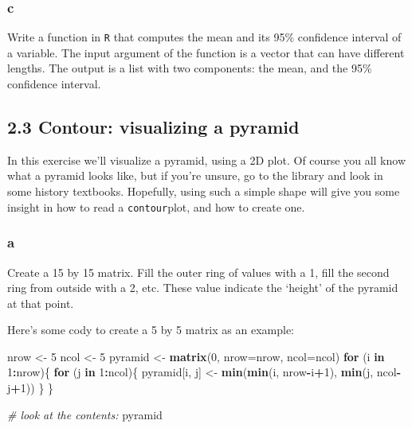 \documentclass[]{article}
\newenvironment{Shaded}{\begin{snugshade}}{\end{snugshade}}
\newcommand{\CommentTok}[1]{\textcolor[rgb]{0.56,0.35,0.01}{\textit{#1}}}
\newcommand{\ControlFlowTok}[1]{\textcolor[rgb]{0.13,0.29,0.53}{\textbf{#1}}}
\newcommand{\DataTypeTok}[1]{\textcolor[rgb]{0.13,0.29,0.53}{#1}}
\newcommand{\DecValTok}[1]{\textcolor[rgb]{0.00,0.00,0.81}{#1}}
\newcommand{\KeywordTok}[1]{\textcolor[rgb]{0.13,0.29,0.53}{\textbf{#1}}}
\newcommand{\NormalTok}[1]{#1}
\newcommand{\OperatorTok}[1]{\textcolor[rgb]{0.81,0.36,0.00}{\textbf{#1}}}
\newcommand{\StringTok}[1]{\textcolor[rgb]{0.31,0.60,0.02}{#1}}
\begin{document}
\hypertarget{c-7}{%
\subsubsection{c}\label{c-7}}

Write a function in \texttt{R} that computes the mean and its 95\(\%\)
confidence interval of a variable. The input argument of the function is
a vector that can have different lengths. The output is a list with two
components: the mean, and the 95\(\%\) confidence interval.

\hypertarget{contour-visualizing-a-pyramid}{%
\subsection{2.3 Contour: visualizing a
pyramid}\label{contour-visualizing-a-pyramid}}

In this exercise we'll visualize a pyramid, using a 2D plot. Of course
you all know what a pyramid looks like, but if you're unsure, go to the
library and look in some history textbooks. Hopefully, using such a
simple shape will give you some insight in how to read a
\texttt{contour}plot, and how to create one.

\hypertarget{a-7}{%
\subsubsection{a}\label{a-7}}

Create a 15 by 15 matrix. Fill the outer ring of values with a 1, fill
the second ring from outside with a 2, etc. These value indicate the
`height' of the pyramid at that point.

Here's some cody to create a 5 by 5 matrix as an example:

\begin{Shaded}
\begin{Highlighting}[]
\NormalTok{nrow <-}\StringTok{ }\DecValTok{5}
\NormalTok{ncol <-}\StringTok{ }\DecValTok{5}
\NormalTok{pyramid <-}\StringTok{ }\KeywordTok{matrix}\NormalTok{(}\DecValTok{0}\NormalTok{, }\DataTypeTok{nrow=}\NormalTok{nrow, }\DataTypeTok{ncol=}\NormalTok{ncol)}
\ControlFlowTok{for}\NormalTok{ (i }\ControlFlowTok{in} \DecValTok{1}\OperatorTok{:}\NormalTok{nrow)\{}
  \ControlFlowTok{for}\NormalTok{ (j }\ControlFlowTok{in} \DecValTok{1}\OperatorTok{:}\NormalTok{ncol)\{}
\NormalTok{    pyramid[i, j] <-}\StringTok{ }\KeywordTok{min}\NormalTok{(}\KeywordTok{min}\NormalTok{(i, nrow}\OperatorTok{-}\NormalTok{i}\OperatorTok{+}\DecValTok{1}\NormalTok{), }\KeywordTok{min}\NormalTok{(j, ncol}\OperatorTok{-}\NormalTok{j}\OperatorTok{+}\DecValTok{1}\NormalTok{))}
\NormalTok{  \}}
\NormalTok{\}}

\CommentTok{# look at the contents:}
\NormalTok{pyramid}
\end{Highlighting}
\end{Shaded}
\end{document}

